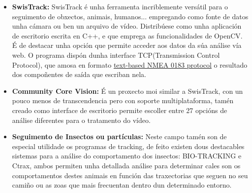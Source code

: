         \begin{itemize}
         \item \textbf{SwisTrack:}\cite{SwisTrack-webPage}
            SwisTrack é unha ferramenta incriblemente versátil para o seguimento de obxectos, 
            animais, humanos... empregando como fonte de datos unha cámara ou ben un arquivo de 
            vídeo. Distribúese como unha aplicación de escritorio escrita en C++, e que emprega as 
            funcionalidades de OpenCV.
            É de destacar unha opción que permite acceder aos datos da súa análise vía web. O 
            programa dispón dunha interface TCP(Transmission Control Protocol), que amosa en formato
            \underline{text-based NMEA 0183 protocol} o resultado dos compoñentes de saída que 
            escriban nela.
            
         \item \textbf{Community Core Vision:}\cite{ccv-webPage}
            É un proxecto moi similar a SwisTrack, con un pouco menos de transcendencia pero con 
            soporte multiplataforma, tamén creado como interface de escritorio permite escoller 
            entre 27 opcións de análise diferentes para o tratamento do vídeo.
            
        \item \textbf{Seguimento de Insectos ou partículas:}
            Neste campo tamén son de especial utilidade os programas de tracking, de feito existen 
            dous destacables sistemas para a análise do comportamento dos insectos: BIO-TRACKING
            \cite{bio-tracking-webPage} e Ctrax\cite{ctrax-webPage}, ambos permiten unha detallada
            análise para determinar cales son os comportamentos destes animais en función das
            traxectorias que seguen no seu camiño ou as zoas que mais frecuentan dentro dun
            determinado entorno.
        \end{itemize}


	
	
	
	
	
	
	
	
	
	
	
	
	
	